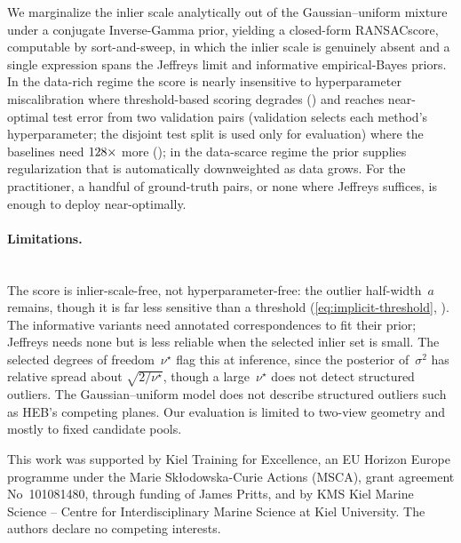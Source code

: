 \documentclass{article}
\newcommand{\mname}[1]{\texorpdfstring{#1\xspace}{#1}}
\newcommand{\ransac}{\mname{RANSAC}}
\newcommand{\heb}{\mname{HEB}}
\newcommand{\gaussunif}{Gaussian--uniform\xspace}
\newcommand{\invgamma}{Inverse-Gamma\xspace}
\newcommand{\sortsweep}{sort-and-sweep\xspace}
\begin{document}
We marginalize the inlier scale analytically out of the
\gaussunif mixture under a conjugate \invgamma
prior, yielding a closed-form \ransac score, computable by
\sortsweep, in which the inlier scale is genuinely absent and
a single expression spans the Jeffreys limit and informative
empirical-Bayes priors.  In the data-rich regime the score is
nearly insensitive to hyperparameter miscalibration where
threshold-based scoring degrades () and
reaches near-optimal test error from two validation pairs
(validation selects each method's hyperparameter; the disjoint
test split is used only for evaluation) where the baselines need
$128\times$ more (); in the
data-scarce regime the prior supplies regularization that is
automatically downweighted as data grows.  For the practitioner,
a handful of ground-truth pairs, or none where Jeffreys
suffices, is enough to deploy near-optimally.

\paragraph{Limitations.}\mbox{}\\
The score is inlier-scale-free, not hyperparameter-free: the outlier
half-width~$a$ remains, though it is far less sensitive than a
threshold (\cref{eq:implicit-threshold}, ).  The informative variants need
annotated correspondences to fit their prior; Jeffreys needs none but
is less reliable when the selected inlier set is small.  The selected
degrees of freedom~$\nu^\star$ flag this at inference, since the
posterior of~$\sigma^2$ has relative spread about
$\sqrt{2/\nu^\star}$, though a large~$\nu^\star$ does not detect
structured outliers.  The \gaussunif model
does not describe structured outliers such as \heb's competing
planes.  Our evaluation is limited to two-view geometry and mostly to fixed
candidate pools.

\begin{ack}
	This work was supported by Kiel Training for Excellence, an EU
	Horizon Europe programme under the Marie Sk\l{}odowska-Curie Actions
	(MSCA), grant agreement No~101081480, through funding of James Pritts,
	and by KMS Kiel Marine Science -- Centre for Interdisciplinary Marine
	Science at Kiel University.  The authors declare no competing
	interests.
\end{ack}



\end{document}
